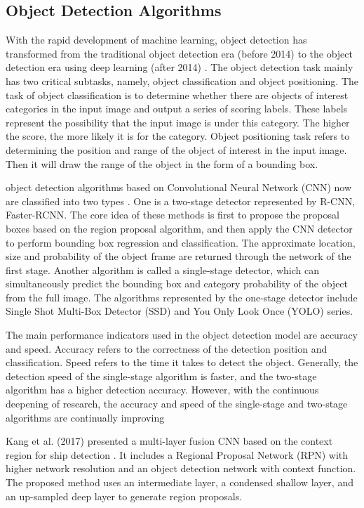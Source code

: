 \documentclass[sensors,article,submit,moreauthors,pdftex]{Definitions/mdpi}
\begin{document}
\subsection{Object Detection Algorithms}
With the rapid development of machine learning, object detection has transformed from the traditional object detection era (before 2014) to the object detection era using deep learning (after 2014) \cite{zou2019object}. The object detection task mainly has two critical subtasks, namely, object classification and object positioning. The task of object classification is to determine whether there are objects of interest categories in the input image and output a series of scoring labels. These labels represent the possibility that the input image is under this category. The higher the score, the more likely it is for the category. Object positioning task refers to determining the position and range of the object of interest in the input image. Then it will draw the range of the object in the form of a bounding box.

object detection algorithms based on Convolutional Neural Network (CNN) now are classified into two types \cite{soviany2018optimizing, duan2020corner}. One is a two-stage detector represented by R-CNN, Faster-RCNN. The core idea of these methods is first to propose the proposal boxes based on the region proposal algorithm, and then apply the CNN detector to perform bounding box regression and classification. The approximate location, size and probability of the object frame are returned through the network of the first stage. Another algorithm is called a single-stage detector, which can simultaneously predict the bounding box and category probability of the object from the full image. The algorithms represented by the one-stage detector include Single Shot Multi-Box Detector (SSD) and You Only Look Once (YOLO) series.

The main performance indicators used in the object detection model are accuracy and speed. Accuracy refers to the correctness of the detection position and classification. Speed refers to the time it takes to detect the object. Generally, the detection speed of the single-stage algorithm is faster, and the two-stage algorithm has a higher detection accuracy. However, with the continuous deepening of research, the accuracy and speed of the single-stage and two-stage algorithms are continually improving

Kang et al. (2017) presented a multi-layer fusion CNN based on the context region for ship detection \cite{kang2017contextual}. It includes a Regional Proposal Network (RPN) with higher network resolution and an object detection network with context function. The proposed method uses an intermediate layer, a condensed shallow layer, and an up-sampled deep layer to generate region proposals.
\end{document}
